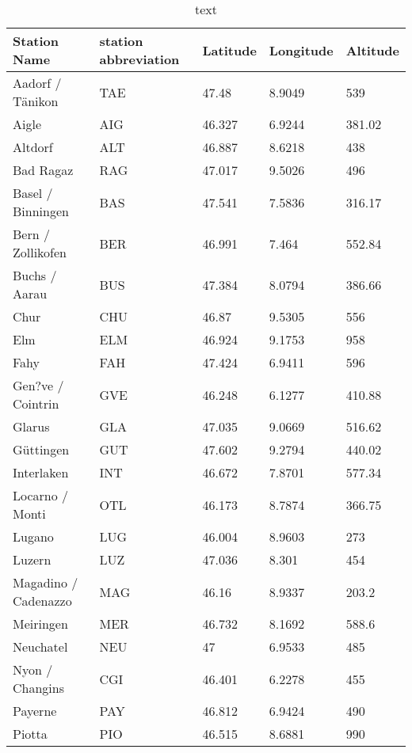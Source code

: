 ﻿\begin{table}[!ht]
    \centering
    \caption{text}
    \begin{tabular}{|l|l|l|l|l|}
    \hline
        Station Name & station abbreviation & Latitude & Longitude & Altitude \\ \hline
        Aadorf / Tänikon & TAE & 47.48 & 8.9049 & 539 \\ \hline
        Aigle & AIG & 46.327 & 6.9244 & 381.02 \\ \hline
        Altdorf & ALT & 46.887 & 8.6218 & 438 \\ \hline
        Bad Ragaz & RAG & 47.017 & 9.5026 & 496 \\ \hline
        Basel / Binningen & BAS & 47.541 & 7.5836 & 316.17 \\ \hline
        Bern / Zollikofen & BER & 46.991 & 7.464 & 552.84 \\ \hline
        Buchs / Aarau & BUS & 47.384 & 8.0794 & 386.66 \\ \hline
        Chur & CHU & 46.87 & 9.5305 & 556 \\ \hline
        Elm & ELM & 46.924 & 9.1753 & 958 \\ \hline
        Fahy & FAH & 47.424 & 6.9411 & 596 \\ \hline
        Gen?ve / Cointrin & GVE & 46.248 & 6.1277 & 410.88 \\ \hline
        Glarus & GLA & 47.035 & 9.0669 & 516.62 \\ \hline
        Güttingen & GUT & 47.602 & 9.2794 & 440.02 \\ \hline
        Interlaken & INT & 46.672 & 7.8701 & 577.34 \\ \hline
        Locarno / Monti & OTL & 46.173 & 8.7874 & 366.75 \\ \hline
        Lugano & LUG & 46.004 & 8.9603 & 273 \\ \hline
        Luzern & LUZ & 47.036 & 8.301 & 454 \\ \hline
        Magadino / Cadenazzo & MAG & 46.16 & 8.9337 & 203.2 \\ \hline
        Meiringen & MER & 46.732 & 8.1692 & 588.6 \\ \hline
        Neuchatel & NEU & 47 & 6.9533 & 485 \\ \hline
        Nyon / Changins & CGI & 46.401 & 6.2278 & 455 \\ \hline
        Payerne & PAY & 46.812 & 6.9424 & 490 \\ \hline
        Piotta & PIO & 46.515 & 8.6881 & 990 \\ \hline

\end{tabular}
\end{table}
